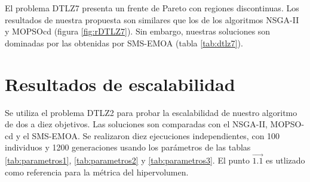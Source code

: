 El problema DTLZ7 presenta un frente de Pareto con regiones discontinuas. Los resultados de nuestra propuesta son similares que los de 
los algoritmos NSGA-II y MOPSOcd (figura \ref{fig:rDTLZ7}). Sin embargo, nuestras soluciones son dominadas por las obtenidas por SMS-EMOA
(tabla \ref{tab:dtlz7}).

\section{Resultados de escalabilidad}

 Se utiliza el problema DTLZ2 para probar la escalabilidad de nuestro algoritmo de dos a diez objetivos. Las soluciones son comparadas con 
 el NSGA-II, MOPSO-cd y el SMS-EMOA. Se realizaron diez ejecuciones independientes, con 100 individuos y 1200 generaciones usando los 
 par\'ametros de las tablas \ref{tab:parametros1}, \ref{tab:parametros2} y \ref{tab:parametros3}. El punto $\vec{1.1}$ es utlizado como 
 referencia para la m\'etrica del hipervolumen.
 
